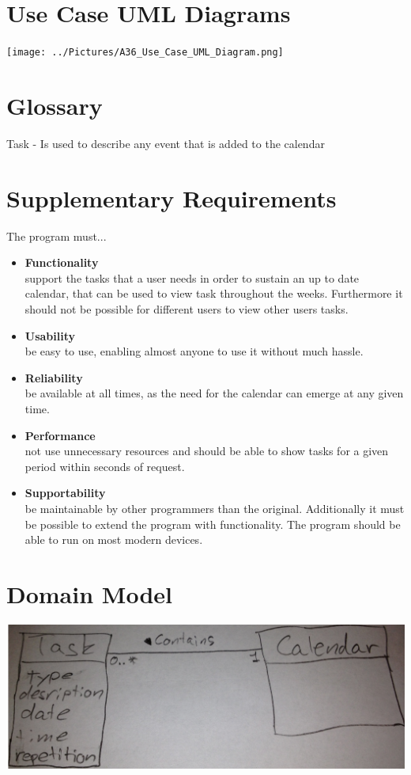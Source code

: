 \documentclass[a4paper, 10pt]{article}
\begin{document}
\section{Use Case UML Diagrams}

\texttt{[image: ../Pictures/A36\_Use\_Case\_UML\_Diagram.png]} 

\section{Glossary}
Task - Is used to describe any event that is added to the calendar

\section{Supplementary Requirements}
The program must...
\begin{itemize}
\item \textbf{Functionality}
	\\support the tasks that a user needs in order to sustain an up to date calendar, that can be used to view task throughout the weeks. Furthermore it should not be possible for different users to view other users tasks.
\item \textbf{Usability}
	\\be easy to use, enabling almost anyone to use it without much hassle.
\item \textbf{Reliability}
	\\be available at all times, as the need for the calendar can emerge at any given time.
\item \textbf{Performance}
	\\not use unnecessary resources and should be able to show tasks for a given period within seconds of request.
\item \textbf{Supportability}
	\\be maintainable by other programmers than the original. Additionally it must be possible to extend the program with functionality. The program should be able to run on most modern devices.
\end{itemize}

\section{Domain Model}
\includegraphics[width=\linewidth]{../Pictures/A38_Domain_Model.jpg} 
\end{document}
